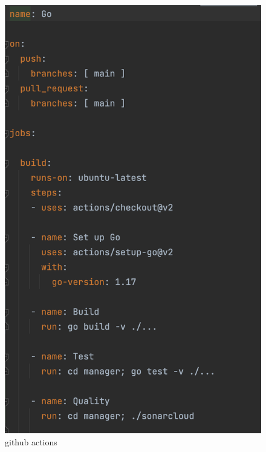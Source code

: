     \begin{figure}[H]
        \centering
        \includegraphics[scale = 0.7]{part/Proyecto_ejecutivo/memoria_constructiva/cicd}
        \caption{github actions}\label{fig:cicd}
    \end{figure}